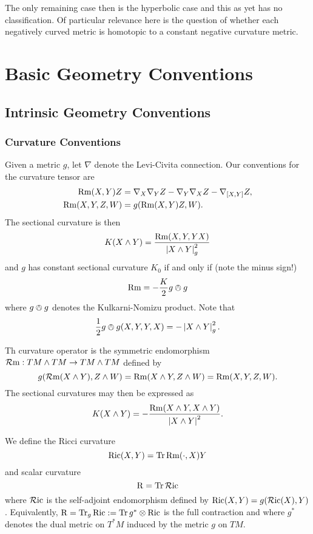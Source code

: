 \documentclass[a4paper, 12pt]{amsart}
\begin{document}
The only remaining case then is the hyperbolic case and this as yet has no classification. Of particular relevance here is the question of whether each negatively curved metric is homotopic to a constant negative curvature metric.

\section{Basic Geometry Conventions}
\label{sec:notation}
\subsection{Intrinsic Geometry Conventions}
\label{subsec:notation_intrinsic}

\subsubsection{Curvature Conventions}
\label{subsubsec:notation_intrinsic_curvature}

Given a metric \(g\), let \(\nabla\) denote the Levi-Civita connection. Our conventions for the curvature tensor are
\[
\begin{split}
\operatorname{Rm}(X, Y) Z &= \nabla_X \nabla_Y Z - \nabla_Y \nabla_X Z - \nabla_{[X, Y]} Z, \\
\operatorname{Rm}(X, Y, Z, W) &= g(\operatorname{Rm}(X, Y) Z, W).
\end{split}
\]
The sectional curvature is then
\[
K(X \wedge Y) = \frac{\operatorname{Rm}(X, Y, Y X)}{\left\lvert{X \wedge Y}\right\rvert_g^2}
\]
and \(g\) has constant sectional curvature \(K_0\) if and only if (note the minus sign!)
\[
\operatorname{Rm} = -\frac{K}{2} g \owedge g
\]
where \(g \owedge g\) denotes the Kulkarni-Nomizu product. Note that
\[
\frac{1}{2} g \owedge g (X, Y, Y, X) = -\left\lvert{X \wedge Y}\right\rvert_g^2.
\]

Th curvature operator is the symmetric endomorphism \(\operatorname{\mathcal{R}m} : TM \wedge TM \to TM \wedge TM\) defined by
\[
g(\operatorname{\mathcal{R}m}(X\wedge Y), Z \wedge W) = \operatorname{Rm}(X\wedge Y, Z \wedge W) = \operatorname{Rm}(X, Y, Z, W).
\]
The sectional curvatures may then be expressed as
\[
K(X \wedge Y) = -\frac{\operatorname{Rm}(X \wedge Y, X \wedge Y)}{\left\lvert{X \wedge Y}\right\rvert^2}.
\]

We define the Ricci curvature
\[
\operatorname{Ric}(X, Y) = \operatorname{Tr} \operatorname{Rm}(\cdot, X) Y
\]
and scalar curvature
\[
\operatorname{R} = \operatorname{Tr} \operatorname{\mathcal{R}ic}
\]
where \(\operatorname{\mathcal{R}ic}\) is the self-adjoint endomorphism defined by \(\operatorname{Ric}(X, Y) = g(\operatorname{\mathcal{R}ic}(X), Y)\). Equivalently, \(\operatorname{R} = \operatorname{Tr}_g \operatorname{Ric} := \operatorname{Tr} g^{\ast} \otimes \operatorname{Ric}\) is the full contraction and where \(g^{\ast}\) denotes the dual metric on \(T^{\ast}M\) induced by the metric \(g\) on \(TM\).
\end{document}
